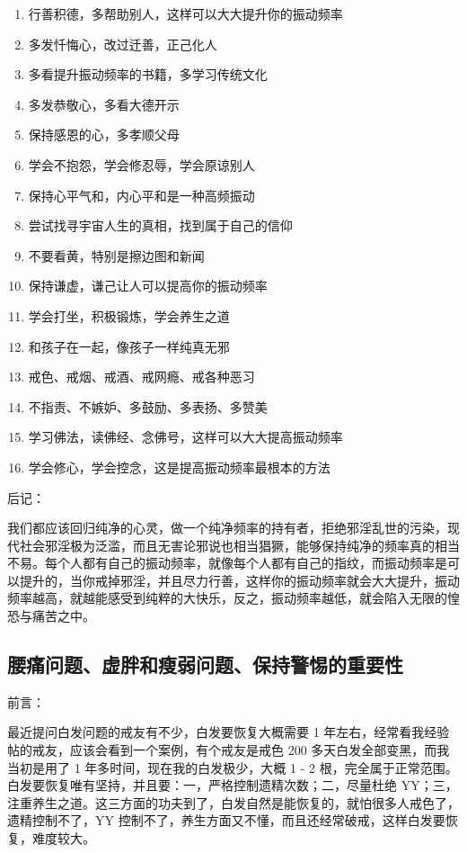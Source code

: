 \documentclass[fontset=founder]{ctexart}
\begin{document}
\begin{enumerate}
    \item 行善积德，多帮助别人，这样可以大大提升你的振动频率
    \item 多发忏悔心，改过迁善，正己化人
    \item 多看提升振动频率的书籍，多学习传统文化
    \item 多发恭敬心，多看大德开示
    \item 保持感恩的心，多孝顺父母
    \item 学会不抱怨，学会修忍辱，学会原谅别人
    \item 保持心平气和，内心平和是一种高频振动
    \item 尝试找寻宇宙人生的真相，找到属于自己的信仰
    \item 不要看黄，特别是擦边图和新闻
    \item 保持谦虚，谦己让人可以提高你的振动频率
    \item 学会打坐，积极锻炼，学会养生之道
    \item 和孩子在一起，像孩子一样纯真无邪
    \item 戒色、戒烟、戒酒、戒网瘾、戒各种恶习
    \item 不指责、不嫉妒、多鼓励、多表扬、多赞美
    \item 学习佛法，读佛经、念佛号，这样可以大大提高振动频率
    \item 学会修心，学会控念，这是提高振动频率最根本的方法
\end{enumerate}

后记：

我们都应该回归纯净的心灵，做一个纯净频率的持有者，拒绝邪淫乱世的污染，现代社会邪淫极为泛滥，而且无害论邪说也相当猖獗，能够保持纯净的频率真的相当不易。每个人都有自己的振动频率，就像每个人都有自己的指纹，而振动频率是可以提升的，当你戒掉邪淫，并且尽力行善，这样你的振动频率就会大大提升，振动频率越高，就越能感受到纯粹的大快乐，反之，振动频率越低，就会陷入无限的惶恐与痛苦之中。

\subsection{腰痛问题、虚胖和瘦弱问题、保持警惕的重要性}

前言：

最近提问白发问题的戒友有不少，白发要恢复大概需要 1 年左右，经常看我经验帖的戒友，应该会看到一个案例，有个戒友是戒色 200 多天白发全部变黑，而我当初是用了 1 年多时间，现在我的白发极少，大概 1 - 2 根，完全属于正常范围。白发要恢复唯有坚持，并且要：一，严格控制遗精次数；二，尽量杜绝 YY；三，注重养生之道。这三方面的功夫到了，白发自然是能恢复的，就怕很多人戒色了，遗精控制不了，YY 控制不了，养生方面又不懂，而且还经常破戒，这样白发要恢复，难度较大。
\end{document}
